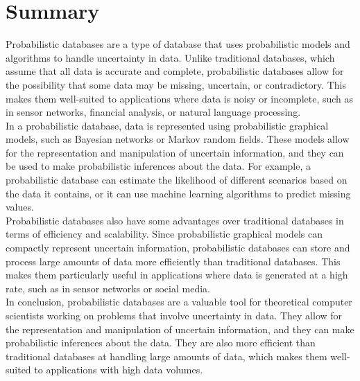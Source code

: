 \chapter{Summary}

Probabilistic databases are a type of database that uses probabilistic models and algorithms to handle uncertainty in data. Unlike traditional databases, which assume that all data is accurate and complete, probabilistic databases allow for the possibility that some data may be missing, uncertain, or contradictory. This makes them well-suited to applications where data is noisy or incomplete, such as in sensor networks, financial analysis, or natural language processing.\\
In a probabilistic database, data is represented using probabilistic graphical models, such as Bayesian networks or Markov random fields. These models allow for the representation and manipulation of uncertain information, and they can be used to make probabilistic inferences about the data. For example, a probabilistic database can estimate the likelihood of different scenarios based on the data it contains, or it can use machine learning algorithms to predict missing values.\\
Probabilistic databases also have some advantages over traditional databases in terms of efficiency and scalability. Since probabilistic graphical models can compactly represent uncertain information, probabilistic databases can store and process large amounts of data more efficiently than traditional databases. This makes them particularly useful in applications where data is generated at a high rate, such as in sensor networks or social media. \\
In conclusion, probabilistic databases are a valuable tool for theoretical computer scientists working on problems that involve uncertainty in data. They allow for the representation and manipulation of uncertain information, and they can make probabilistic inferences about the data. They are also more efficient than traditional databases at handling large amounts of data, which makes them well-suited to applications with high data volumes.
